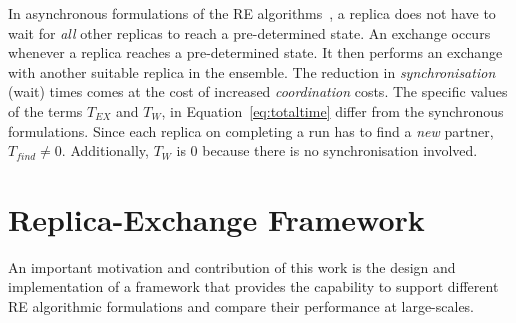 \documentclass{rspublic}
\newcommand{\jhanote}[1]{ {\textcolor{red} { ***shantenu: #1 }}}
\newcommand{\alnote}[1]{ {\textcolor{blue} { ***andre: #1 }}}
\newcommand{\athotanote}[1]{ {\textcolor{green} { ***athota: #1 }}}
\newcommand{\alnote}[1]{}
\newcommand{\athotanote}[1]{}
\newcommand{\jhanote}[1]{}
\begin{document}
In asynchronous formulations of the RE
algorithms~\citep{parashar_arepex,DBLP:journals/jcc/GallicchioLP08}, a
replica does not have to wait for {\it all} other replicas to reach a
pre-determined state. An exchange occurs whenever a replica reaches a
pre-determined state. It then performs an exchange with another suitable
replica in the ensemble.  The reduction in {\it synchronisation}
(wait) times comes at the cost of increased {\it coordination} costs.
The specific values of the terms $T_{EX}$ and $T_W$, in
Equation~\ref{eq:totaltime} differ from the synchronous formulations.
Since each replica on completing a run has to find a {\it new}
partner, $T_{find} \neq 0$.  Additionally, $T_W$ is 0 because there is no synchronisation involved.%




\section{Replica-Exchange Framework}\label{repexfw}

An important motivation and contribution of this work is the design
and implementation of a framework that provides the capability to
support different RE algorithmic formulations and compare their
performance at large-scales.
\end{document}
